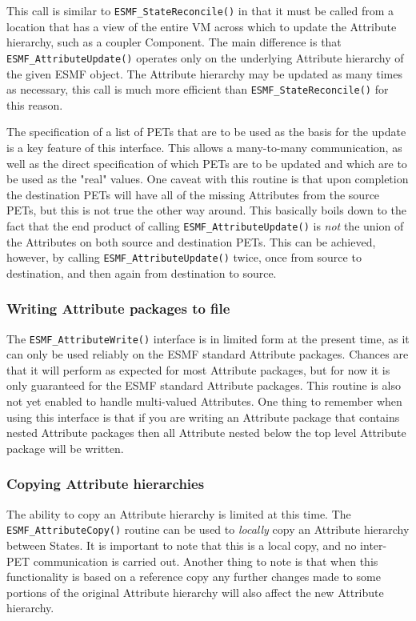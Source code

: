 This call is similar to {\tt ESMF\_StateReconcile()} in that it must be called from a location that has a view of the entire VM across which to update the Attribute hierarchy, such as a coupler Component.  The main difference is that {\tt ESMF\_AttributeUpdate()} operates only on the underlying Attribute hierarchy of the given ESMF object.  The Attribute hierarchy may be updated as many times as necessary, this call is much more efficient than {\tt ESMF\_StateReconcile()} for this reason.  

The specification of a list of PETs that are to be used as the basis for the update is a key feature of this interface.  This allows a many-to-many communication, as well as the direct specification of which PETs are to be updated and which are to be used as the "real" values.  One caveat with this routine is that upon completion the destination PETs will have all of the missing Attributes from the source PETs, but this is not true the other way around.  This basically boils down to the fact that the end product of calling {\tt ESMF\_AttributeUpdate()} is {\it not} the union of the Attributes on both source and destination PETs.  This can be achieved, however, by calling {\tt ESMF\_AttributeUpdate()} twice, once from source to destination, and then again from destination to source.

\subsubsection{Writing Attribute packages to file}

The {\tt ESMF\_AttributeWrite()} interface is in limited form at the present time, as it can only be used reliably on the ESMF standard Attribute packages.  Chances are that it will perform as expected for most Attribute packages, but for now it is only guaranteed for the ESMF standard Attribute packages.  This routine is also not yet enabled to handle multi-valued Attributes.    One thing to remember when using this interface is that if you are writing an Attribute package that contains nested Attribute packages then all Attribute nested below the top level Attribute package will be written.

\subsubsection{Copying Attribute hierarchies}

The ability to copy an Attribute hierarchy is limited at this time.  The {\tt ESMF\_AttributeCopy()} routine can be used to {\it locally} copy an Attribute hierarchy between States.  It is important to note that this is a local copy, and no inter-PET communication is carried out.  Another thing to note is that when this functionality is based on a reference copy any further changes made to some portions of the original Attribute hierarchy will also affect the new Attribute hierarchy.

